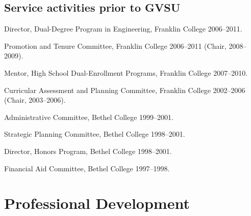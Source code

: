 \documentclass[letterpaper]{article}
\renewenvironment{itemize}{
  \begin{list}{}{
    \setlength{\leftmargin}{1.5em}
	\setlength{\itemsep}{0in}
  }
}{
  \end{list}
}
\begin{document}
\subsection*{Service activities prior to GVSU}
\begin{itemize}
	\item Director, Dual-Degree Program in Engineering, Franklin College 2006--2011. 
	\item Promotion and Tenure Committee, Franklin College 2006--2011 (Chair, 2008--2009). 
	\item Mentor, High School Dual-Enrollment Programs, Franklin College 2007--2010. 
	\item Curricular Assessment and Planning Committee, Franklin College 2002--2006 (Chair, 2003--2006). 
	\item Administrative Committee, Bethel College 1999--2001. 
	\item Strategic Planning Committee, Bethel College 1998--2001. 
	\item Director, Honors Program, Bethel College 1998--2001. 
	\item Financial Aid Committee, Bethel College 1997--1998. 
\end{itemize}


\section*{Professional Development}
\end{document}
